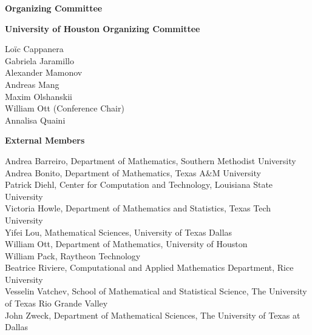 \thispagestyle{empty}
\centerline{\bfseries\Large Organizing Committee}
\vspace{10ex}

\noindent
{\bfseries\large  University of Houston Organizing Committee}
\vspace{1ex}

\noindent
Loïc Cappanera\\
Gabriela Jaramillo\\
Alexander Mamonov\\
Andreas Mang\\
Maxim Olshanskii\\
William Ott (Conference Chair)\\
Annalisa Quaini

\vspace{4ex}

\noindent
{\bfseries\large  External Members}

\vspace{1ex}

\noindent
Andrea Barreiro, Department of Mathematics, Southern Methodist University\\
Andrea Bonito, Department of Mathematics, Texas A\&M University\\
Patrick Diehl, Center for Computation and Technology, Louisiana State University\\
Victoria Howle, Department of Mathematics and Statistics, Texas Tech University\\
Yifei Lou, Mathematical Sciences, University of Texas Dallas\\
William Ott, Department of Mathematics, University of Houston\\
William Pack, Raytheon Technology\\
Beatrice Riviere, Computational and Applied Mathematics Department, Rice University\\
Vesselin Vatchev, School of Mathematical and Statistical Science, The University of Texas Rio Grande Valley\\
John Zweck, Department of Mathematical Sciences, The University of Texas at Dallas\\


\cleardoublepage
\setcounter{page}{3}
